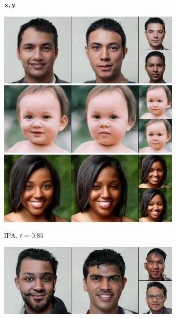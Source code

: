 \begin{figure}[t]
\begin{subfigure}[t]{0.22\textwidth}
      \caption{$\mathbf{x}, \mathbf{y}$}
    \end{subfigure}
    \begin{subfigure}[t]{0.25\textwidth}
      \centering
      \includegraphics[height=\ffhqimgheight]{figs/cigcvae/image-samples/ffhq256/freeform_aipo_0_t=0.85_samples.jpg}
      \includegraphics[height=\ffhqimgheight]{figs/cigcvae/image-samples/ffhq256/freeform_aipo_13_t=0.85_samples.jpg}
      \includegraphics[height=\ffhqimgheight]{figs/cigcvae/image-samples/ffhq256/freeform_aipo_32_t=0.85_samples.jpg}
      \caption{IPA, $t=0.85$}
    \end{subfigure}
    \begin{subfigure}[t]{0.25\textwidth}
      \centering
      \includegraphics[height=\ffhqimgheight]{figs/cigcvae/image-samples/ffhq256/freeform_aipo_0_samples.jpg}

\end{subfigure}
\end{figure}

